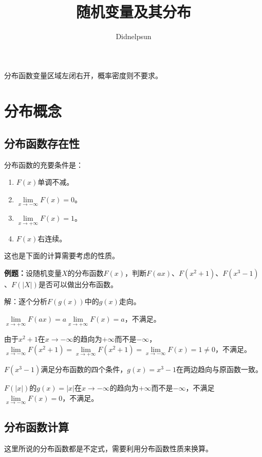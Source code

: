 \documentclass[UTF8, 12pt]{ctexart}
\author{Didnelpsun}
\title{随机变量及其分布}
\date{}
\begin{document}
\maketitle
\pagestyle{empty}
\thispagestyle{empty}
\tableofcontents
\thispagestyle{empty}
\newpage
\pagestyle{plain}
\setcounter{page}{1}

分布函数变量区域左闭右开，概率密度则不要求。

\section{分布概念}

\subsection{分布函数存在性}

分布函数的充要条件是：

\begin{enumerate}
    \item $F(x)$单调不减。
    \item $\lim\limits_{x\to-\infty}F(x)=0$。
    \item $\lim\limits_{x\to+\infty}F(x)=1$。
    \item $F(x)$右连续。
\end{enumerate}

这也是下面的计算需要考虑的性质。

\textbf{例题：}设随机变量$X$的分布函数$F(x)$，判断$F(ax)$、$F(x^2+1)$、$F(x^3-1)$、$F(\vert X\vert)$是否可以做出分布函数。

解：逐个分析$F(g(x))$中的$g(x)$走向。

$\lim\limits_{x\to+\infty}F(ax)=a\lim\limits_{x\to+\infty}F(x)=a$，不满足。

由于$x^2+1$在$x\to-\infty$的趋向为$+\infty$而不是$-\infty$，$\lim\limits_{x\to-\infty}F(x^2+1)=\lim\limits_{x\to+\infty}F(x^2+1)=\lim\limits_{x\to-\infty}F(x)=1\neq0$，不满足。

$F(x^3-1)$满足分布函数的四个条件，$g(x)=x^3-1$在两边趋向与原函数一致。

$F(\vert x\vert)$的$g(x)=\vert x\vert$在$x\to-\infty$的趋向为$+\infty$而不是$-\infty$，不满足$\lim\limits_{x\to-\infty}F(x)=0$，不满足。

\subsection{分布函数计算}

这里所说的分布函数都是不定式，需要利用分布函数性质来换算。
\end{document}
